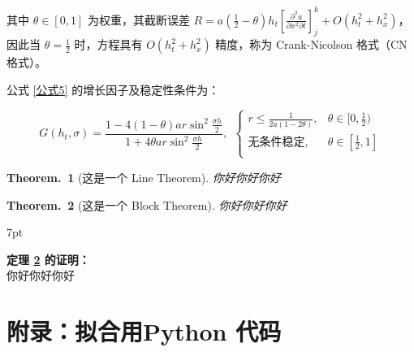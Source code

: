 \documentclass[UTF8]{report}
\theoremstyle{MyLineTheoremStyle} %
\newtheorem{LineTheorem}{Theorem.\,}
\theoremstyle{MyBlockTheoremStyle} %
\newtheorem{BlockTheorem}[LineTheorem]{Theorem.\,} %
\theoremstyle{MySubsubsectionStyle} %
\newenvironment{graybox}{%
        \def\FrameCommand{%
        \hspace{1pt}%
        {\color{gray}\small \vrule width 2pt}%
        {\color{graybox_color}\vrule width 4pt}%
        \colorbox{graybox_color}%
        }%
        \MakeFramed{\advance\hsize-\width\FrameRestore}%
        \noindent\hspace{-4.55pt}%
        \begin{adjustwidth}{}{7pt}%
        \vspace{2pt}\vspace{2pt}%
        }
        {%
        \vspace{2pt}\end{adjustwidth}\endMakeFramed%
        }
\begin{document}
其中 $\theta \in [0, 1]$ 为权重，其截断误差 $R = a\left(\frac{1}{2}-\theta\right)h_t\left[\frac{\partial^{3}u}{\partial x^{2}\partial t}\right]_{j}^{k}+O(h_t^{2}+h_x^2)$，因此当 $\theta = \frac{1}{2}$ 时，方程具有 $O(h_t^{2}+h_x^2)$ 精度，称为 Crank-Nicolson 格式（CN 格式）。


公式 \ref{公式5} 的增长因子及稳定性条件为：

\begin{equation}
   G(h_t,\sigma)=\frac{1-4(1-\theta)ar\sin^2\frac{\sigma h}2}{1+4\theta ar\sin^2\frac{\sigma h}2}, \ \ 
   \begin{cases}
       r\leqslant\frac{1}{2a(1-2\theta)}, & \theta \in [0, \frac{1}{2}) \\ 
       \text{无条件稳定}, & \theta \in [\frac{1}{2}, 1] \\ 
   \end{cases}
\end{equation}


\begin{LineTheorem}[这是一个 Line Theorem]\label{这是一个 Line Theorem}
   你好你好你好
\end{LineTheorem}

\begin{BlockTheorem}[这是一个 Block Theorem]\label{这是一个 Block Theorem}
   你好你好你好
\end{BlockTheorem}



\begin{graybox}
\textbf{定理 \ref{这是一个 Block Theorem} 的证明：}\\
你好你好你好
\end{graybox}



\cleardoublepage
\section{附录：拟合用Python 代码}
\end{document}
